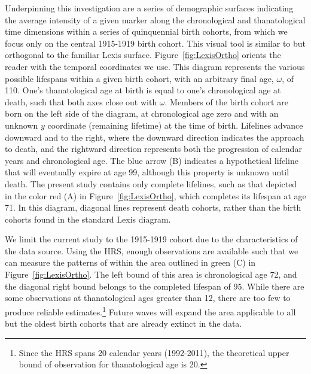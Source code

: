 \documentclass[11pt,oneside]{article} %
\begin{document}
Underpinning this investigation are a series of demographic surfaces indicating
the average intensity of a given marker along the chronological and thanatological
time dimensions within a series of quinquennial birth cohorts, from which we
focus only on the central 1915-1919 birth cohort.
This visual tool is similar to but orthogonal to the familiar Lexis surface.
Figure~\ref{fig:LexisOrtho} orients the reader with the temporal coordinates we
use. This diagram represents the various possible lifespans within a given birth cohort, with an arbitrary final age, $\omega$, of 110. One's
thanatological age at birth is equal to one's chronological age at death, such
that both axes close out with $\omega$. Members of the birth cohort are born on
the left side of the diagram, at chronological age zero and with an unknown $y$ coordinate (remaining lifetime) at the time of birth.
Lifelines advance downward and to the right, where the downward direction indicates the approach to death, and the
rightward direction represents both the progression of calendar years and
chronological age. The blue arrow (B) indicates a hypothetical lifeline that
will eventually expire at age 99, although this property is unknown until death. The
present study contains only complete lifelines, such as that depicted in the
color red (A) in Figure~\ref{fig:LexisOrtho}, which completes its lifespan at
age 71. In this diagram, diagonal lines represent death cohorts, rather than the
birth cohorts found in the standard Lexis diagram.

We limit the current study to the 1915-1919 cohort due
to the characteristics of the data source. Using the HRS, enough
observations are available such that we can measure the patterns of
within the area outlined in green (C) in Figure~\ref{fig:LexisOrtho}. The
left bound of this area is chronological age 72, and the diagonal right
bound belongs to the completed lifespan of 95. While there are some observations
at thanatological ages greater than 12, there are too few to produce reliable
estimates.\footnote{Since the HRS spans 20 calendar years (1992-2011), the
theoretical upper bound of observation for thanatological age is 20.} Future
waves will expand the area applicable to all but the oldest birth cohorts that are already extinct in the data.
\end{document}
